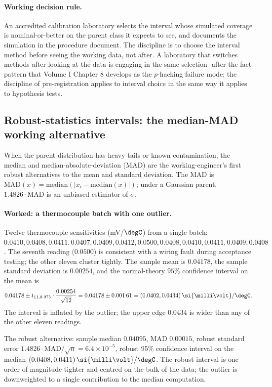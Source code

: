 \paragraph{Working decision rule.} An accredited calibration
laboratory selects the interval whose simulated coverage is
nominal-or-better on the parent class it expects to see, and
documents the simulation in the procedure document. The
discipline is to choose the interval method before seeing the
working data, not after. A laboratory that switches methods
after looking at the data is engaging in the same selection-
after-the-fact pattern that Volume I Chapter 8 develops as the
$p$-hacking failure mode; the discipline of pre-registration
applies to interval choice in the same way it applies to
hypothesis tests.

\subsection{Robust-statistics intervals: the median-MAD
working alternative}

When the parent distribution has heavy tails or known
contamination, the median and median-absolute-deviation (MAD)
are the working-engineer's first robust alternatives to the
mean and standard deviation. The MAD is
$\text{MAD}(x) = \text{median}(|x_{i} - \text{median}(x)|)$;
under a Gaussian parent, $1.4826 \cdot \text{MAD}$ is an
unbiased estimator of $\sigma$.

\paragraph{Worked: a thermocouple batch with one outlier.}
Twelve thermocouple sensitivities (mV/$\degC$) from a single
batch: $0.0410, 0.0408, 0.0411, 0.0407, 0.0409, 0.0412,
0.0500, 0.0408, 0.0410, 0.0411, 0.0409, 0.0408$. The seventh
reading ($0.0500$) is consistent with a wiring fault during
acceptance testing; the other eleven cluster tightly. The
sample mean is $0.04178$, the sample standard deviation is
$0.00254$, and the normal-theory $95\%$ confidence interval
on the mean is
\[
0.04178 \pm t_{11, 0.975} \cdot \frac{0.00254}{\sqrt{12}}
= 0.04178 \pm 0.001\,61 = (0.0402, 0.0434)\,\si{\milli\volt}/\degC.
\]
The interval is inflated by the outlier; the upper edge
$0.0434$ is wider than any of the other eleven readings.

The robust alternative: sample median $0.04095$, MAD $0.00015$,
robust standard error $1.4826 \cdot \text{MAD}/\sqrt{n} =
6.4 \times 10^{-5}$, robust $95\%$ confidence interval on the
median
$(0.0408, 0.0411)\,\si{\milli\volt}/\degC$. The robust
interval is one order of magnitude tighter and centred on the
bulk of the data; the outlier is downweighted to a single
contribution to the median computation.

